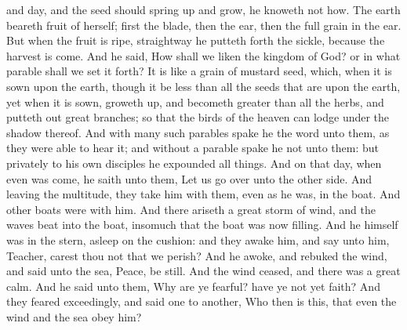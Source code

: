 and day, and the seed should spring up and grow, he knoweth not how. The earth beareth fruit of herself; first the blade, then the ear, then the full grain in the ear. But when the fruit is ripe, straightway he putteth forth the sickle, because the harvest is come.  And he said, How shall we liken the kingdom of God? or in what parable shall we set it forth? It is like a grain of mustard seed, which, when it is sown upon the earth, though it be less than all the seeds that are upon the earth, yet when it is sown, groweth up, and becometh greater than all the herbs, and putteth out great branches; so that the birds of the heaven can lodge under the shadow thereof.  And with many such parables spake he the word unto them, as they were able to hear it; and without a parable spake he not unto them: but privately to his own disciples he expounded all things.  And on that day, when even was come, he saith unto them, Let us go over unto the other side. And leaving the multitude, they take him with them, even as he was, in the boat. And other boats were with him. And there ariseth a great storm of wind, and the waves beat into the boat, insomuch that the boat was now filling. And he himself was in the stern, asleep on the cushion: and they awake him, and say unto him, Teacher, carest thou not that we perish? And he awoke, and rebuked the wind, and said unto the sea, Peace, be still. And the wind ceased, and there was a great calm. And he said unto them, Why are ye fearful? have ye not yet faith? And they feared exceedingly, and said one to another, Who then is this, that even the wind and the sea obey him? 

